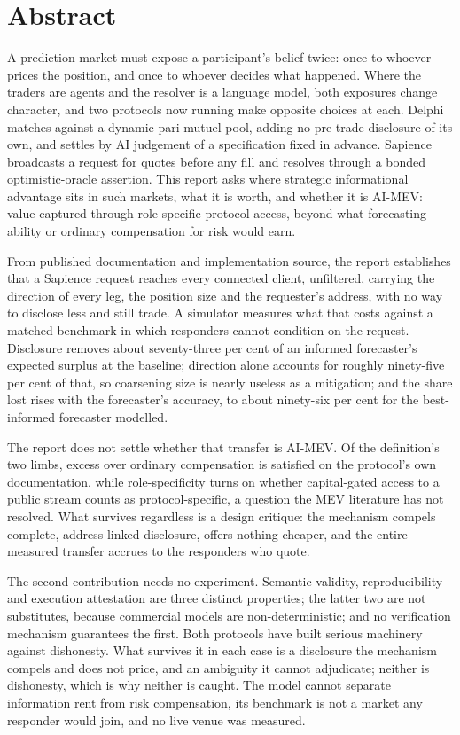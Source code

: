 \chapter*{Abstract}

A prediction market must expose a participant's belief twice: once to whoever prices the
position, and once to whoever decides what happened. Where the traders are agents and the
resolver is a language model, both exposures change character, and two protocols now running
make opposite choices at each. Delphi matches against a dynamic pari-mutuel pool, adding no
pre-trade disclosure of its own, and settles by AI judgement of a specification fixed in
advance. Sapience broadcasts a request for quotes before any fill and resolves through a
bonded optimistic-oracle assertion. This report asks where strategic informational advantage
sits in such markets, what it is worth, and whether it is AI-MEV: value captured through
role-specific protocol access, beyond what forecasting ability or ordinary compensation for
risk would earn.

From published documentation and implementation source, the report establishes that a
Sapience request reaches every connected client, unfiltered, carrying the direction of every
leg, the position size and the requester's address, with no way to disclose less and still
trade. A simulator measures what that costs against a matched benchmark in which responders
cannot condition on the request. Disclosure removes about seventy-three per cent of an
informed forecaster's expected surplus at the baseline; direction alone accounts for roughly
ninety-five per cent of that, so coarsening size is nearly useless as a mitigation; and the
share lost rises with the forecaster's accuracy, to about ninety-six per cent for the
best-informed forecaster modelled.

The report does not settle whether that transfer is AI-MEV. Of the definition's two limbs,
excess over ordinary compensation is satisfied on the protocol's own documentation, while
role-specificity turns on whether capital-gated access to a public stream counts as
protocol-specific, a question the MEV literature has not resolved. What survives regardless
is a design critique: the mechanism compels complete, address-linked disclosure, offers
nothing cheaper, and the entire measured transfer accrues to the responders who quote.

The second contribution needs no experiment. Semantic validity, reproducibility and
execution attestation are three distinct properties; the latter two are not substitutes,
because commercial models are non-deterministic; and no verification mechanism guarantees
the first. Both protocols have built serious machinery against dishonesty. What survives it in
each case is a disclosure the mechanism compels and does not price, and an ambiguity it
cannot adjudicate; neither is dishonesty, which is why neither is caught. The model cannot separate information rent from risk
compensation, its benchmark is not a market any responder would join, and no live venue was
measured.
